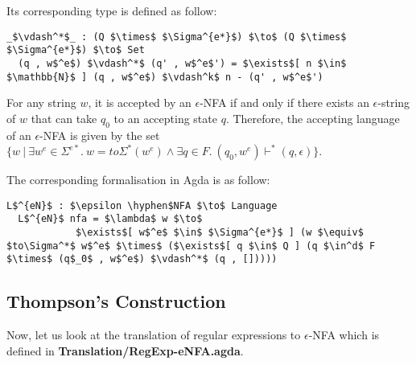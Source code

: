 \par Its corresponding type is defined as follow: 
\begin{lstlisting}[mathescape=true,xleftmargin=.3\textwidth]
  _$\vdash^*$_ : (Q $\times$ $\Sigma^{e*}$) $\to$ (Q $\times$ $\Sigma^{e*}$) $\to$ Set
  (q , w$^e$) $\vdash^*$ (q' , w$^e$') = $\exists$[ n $\in$ $\mathbb{N}$ ] (q , w$^e$) $\vdash^k$ n - (q' , w$^e$')
\end{lstlisting}

\begin{defn}
\label{defn:enfa}
\noindent For any string \(w\), it is accepted by an \(\epsilon\)-NFA
if and only if there exists an \(\epsilon\)-string of \(w\)
that can take \(q_0\) to an accepting state \(q\). Therefore, the
accepting language of an \(\epsilon\)-NFA is given by the set \(\{w\ |\ \exists w^e\in
\Sigma^{e*}.\ w = to\Sigma^*(w^e) \wedge \exists q\in F.\ (q_0,w^e) \vdash^* (q,\epsilon)\}\). 
\end{defn}

\par The corresponding formalisation in Agda is as follow: 
\begin{lstlisting}[mathescape=true,xleftmargin=.3\textwidth]
  L$^{eN}$ : $\epsilon \hyphen$NFA $\to$ Language
  L$^{eN}$ nfa = $\lambda$ w $\to$ 
            $\exists$[ w$^e$ $\in$ $\Sigma^{e*}$ ] (w $\equiv$ $to\Sigma^*$ w$^e$ $\times$ ($\exists$[ q $\in$ Q ] (q $\in^d$ F $\times$ (q$_0$ , w$^e$) $\vdash^*$ (q , []))))
\end{lstlisting}

\subsection{Thompson's Construction}
\par Now, let us look at the translation of regular expressions to
\(\epsilon\)-NFA which is defined in \textbf{Translation/RegExp-eNFA.agda}. 

